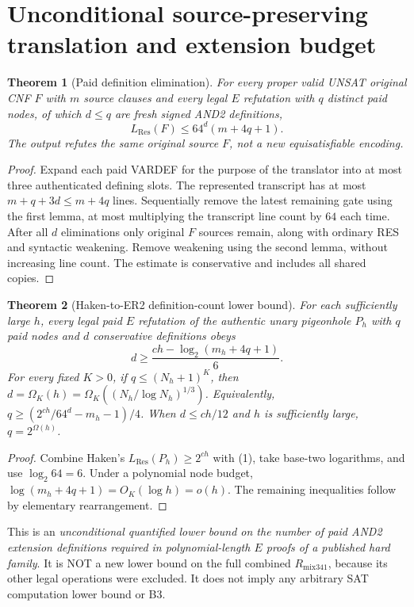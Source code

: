 \documentclass[11pt]{article}
\newtheorem{theorem}{Theorem}
\begin{document}
\section*{Unconditional source-preserving translation and extension budget}
\begin{theorem}[Paid definition elimination]
For \emph{every} proper valid UNSAT original CNF $F$ with $m$ source clauses and \emph{every} legal $E$ refutation with $q$ distinct paid nodes, of which $d\le q$ are fresh signed AND2 definitions,
\[
\boxed{\quad L_{\mathrm{Res}}(F)\le64^d(m+4q+1).\quad}\tag{1}
\]
The output refutes the \emph{same original source $F$}, not a new equisatisfiable encoding.
\end{theorem}
\begin{proof}
Expand each paid VARDEF for the purpose of the translator into at most three authenticated defining slots. The represented transcript has at most $m+q+3d\le m+4q$ lines. Sequentially remove the latest remaining gate using the first lemma, at most multiplying the transcript line count by $64$ each time. After all $d$ eliminations only original $F$ sources remain, along with ordinary RES and syntactic weakening. Remove weakening using the second lemma, without increasing line count. The estimate is conservative and includes all shared copies.
\end{proof}

\begin{theorem}[Haken-to-ER2 definition-count lower bound]
For each sufficiently large $h$, every legal paid $E$ refutation of the authentic unary pigeonhole $P_h$ with $q$ paid nodes and $d$ conservative definitions obeys
\[
\boxed{\quad d\ge\frac{ch-\log_2(m_h+4q+1)}{6}.\quad}\tag{2}
\]
For every fixed $K>0$, if $q\le(N_h+1)^K$, then $d=\Omega_K(h)=\Omega_K((N_h/\log N_h)^{1/3})$. Equivalently, $q\ge (2^{ch}/64^d-m_h-1)/4$. When $d\le ch/12$ and $h$ is sufficiently large, $q=2^{\Omega(h)}$.
\end{theorem}
\begin{proof}
Combine Haken's $L_{\mathrm{Res}}(P_h)\ge2^{ch}$ with (1), take base-two logarithms, and use $\log_2 64=6$. Under a polynomial node budget, $\log(m_h+4q+1)=O_K(\log h)=o(h)$. The remaining inequalities follow by elementary rearrangement.
\end{proof}

This is an \emph{unconditional quantified lower bound on the number of paid AND2 extension definitions required in polynomial-length $E$ proofs of a published hard family}. It is NOT a new lower bound on the full combined $R_{\mathrm{mix341}}$, because its other legal operations were excluded. It does not imply any arbitrary SAT computation lower bound or B3.
\end{document}
